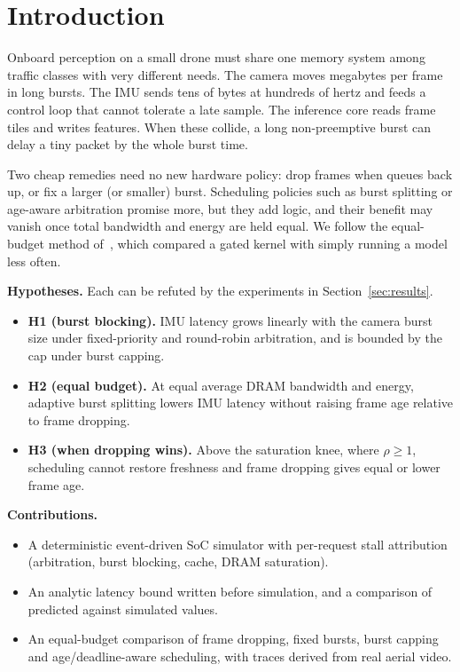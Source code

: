 \documentclass[conference]{IEEEtran}
\begin{document}
\section{Introduction}
Onboard perception on a small drone must share one memory system among traffic classes with very different needs. The camera moves megabytes per frame in long bursts. The IMU sends tens of bytes at hundreds of hertz and feeds a control loop that cannot tolerate a late sample. The inference core reads frame tiles and writes features. When these collide, a long non-preemptive burst can delay a tiny packet by the whole burst time.

Two cheap remedies need no new hardware policy: drop frames when queues back up, or fix a larger (or smaller) burst. Scheduling policies such as burst splitting or age-aware arbitration promise more, but they add logic, and their benefit may vanish once total bandwidth and energy are held equal. We follow the equal-budget method of~\cite{baig2026fewer}, which compared a gated kernel with simply running a model less often.

\textbf{Hypotheses.} Each can be refuted by the experiments in Section~\ref{sec:results}.
\begin{itemize}
\item \textbf{H1 (burst blocking).} IMU \pone{} latency grows linearly with the camera burst size under fixed-priority and round-robin arbitration, and is bounded by the cap under burst capping.
\item \textbf{H2 (equal budget).} At equal average DRAM bandwidth and energy, adaptive burst splitting lowers IMU \pone{} latency without raising frame age relative to frame dropping.
\item \textbf{H3 (when dropping wins).} Above the saturation knee, where $\rho\!\ge\!1$, scheduling cannot restore freshness and frame dropping gives equal or lower frame age.
\end{itemize}

\textbf{Contributions.}
\begin{itemize}
\item A deterministic event-driven SoC simulator with per-request stall attribution (arbitration, burst blocking, cache, DRAM saturation).
\item An analytic latency bound written before simulation, and a comparison of predicted against simulated values.
\item An equal-budget comparison of frame dropping, fixed bursts, burst capping and age/deadline-aware scheduling, with traces derived from real aerial video.
\end{itemize}
\end{document}
